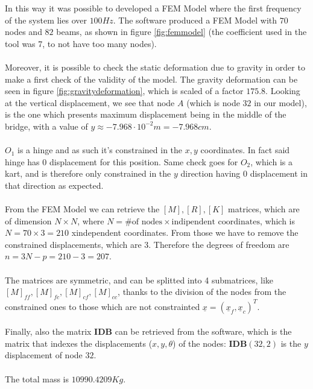 \documentclass[10pt,a4paper,final]{report}
\begin{document}
In this way it was possible to developed a FEM Model where the first frequency of the system lies over $100Hz$. The software produced a FEM Model with $70$ nodes and $82$ beams, as shown in figure \ref{fig:femmodel} (the coefficient used in the tool was 7, to not have too many nodes). \\ \\
Moreover, it is possible to check the static deformation due to gravity in order to make a first check of the validity of the model. The gravity deformation can be seen in figure \ref{fig:gravitydeformation}, which is scaled of a factor $175.8$. Looking at the vertical displacement, we see that node $A$ (which is node $32$ in our model), is the one which presents maximum displacement being in the middle of the bridge, with a value of $y \approx -7.968\cdot 10^{-2} m = -7.968 cm$.
\\ \\
$O_1$ is a hinge and as such it's constrained in the $x,y$ coordinates. In fact said hinge has $0$ displacement for this position. 
Same check goes for $O_2$, which is a kart, and is therefore only constrained in the $y$ direction having $0$ displacement in that direction as expected. \\ \\
From the FEM Model we can retrieve the $[M],[R],[K]$ matrices, which are of dimension $N \times N$, where $N=\text{\# of nodes} \times \text{indipendent coordinates}$, which is $N=70\times 3 = 210$ xindependent coordinates. From those we have to remove the constrained displacements, which are $3$. Therefore the degrees of freedom are $n=3N-p = 210-3=207$.
\\ \\
The matrices are symmetric, and can be splitted into 4 submatrices, like $[M]_{ff}, [M]_{fc}, [M]_{cf}, [M]_{cc}$, thanks to the division of the nodes from the constrained ones to those which are not constrainted $\underline{x}= (\underline{x}_{f}, \underline{x}_{c})^T$. \\ \\
Finally, also the matrix \textbf{IDB} can be retrieved from the software, which is the matrix that indexes the displacements ($x,y,\theta$) of the nodes: $\textbf{IDB}(32,2)$ is the $y$ displacement of node $32$.
\\ \\
The total mass is $10990.4209 Kg$.
\newpage
\end{document}
